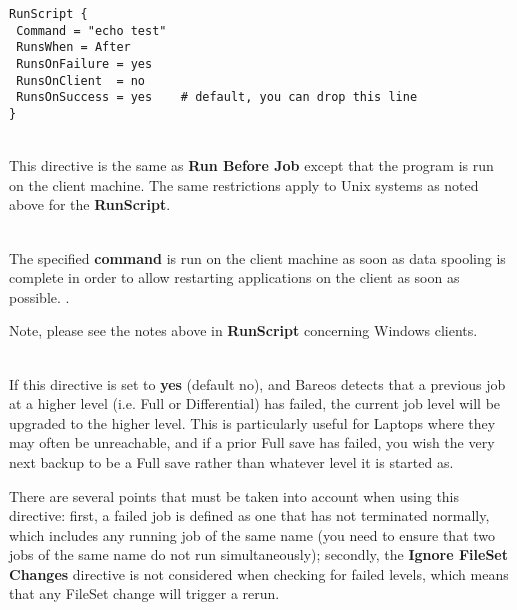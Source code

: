 \begin{description}
\begin{verbatim}
RunScript {
 Command = "echo test"
 RunsWhen = After
 RunsOnFailure = yes
 RunsOnClient  = no
 RunsOnSuccess = yes    # default, you can drop this line
}
\end{verbatim}


\item [Client Run Before Job = {\textless}command{\textgreater}] \hfill \\
This directive is the same as {\bf Run Before Job} except that the
program is run on the client machine.  The same restrictions apply to
Unix systems as noted above for the {\bf RunScript}.

\item [Client Run After Job = {\textless}command{\textgreater}] \hfill \\
The specified {\bf command} is run on the client machine as soon
as data spooling is complete in order to allow restarting applications
on the client as soon as possible. .

Note, please see the notes above in {\bf RunScript}
concerning Windows clients.

\item [Rerun Failed Levels = {\textless}yes{\textbar}no{\textgreater}] \hfill \\
If this directive is set to {\bf yes} (default no), and Bareos detects that
a previous job at a higher level (i.e.  Full or Differential) has failed,
the current job level will be upgraded to the higher level.  This is
particularly useful for Laptops where they may often be unreachable, and if
a prior Full save has failed, you wish the very next backup to be a Full
save rather than whatever level it is started as.

There are several points that must be taken into account when using this
directive: first, a failed job is defined as one that has not terminated
normally, which includes any running job of the same name (you need to
ensure that two jobs of the same name do not run simultaneously);
secondly, the {\bf Ignore FileSet Changes} directive is not considered
when checking for failed levels, which means that any FileSet change will
trigger a rerun.


\end{description}
